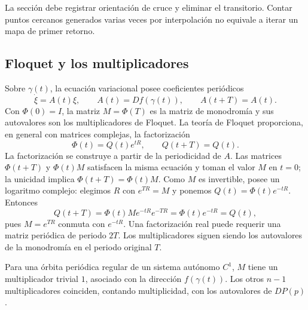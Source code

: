La sección debe registrar orientación de cruce y eliminar el transitorio.
Contar puntos cercanos generados varias veces por interpolación no equivale a
iterar un mapa de primer retorno.

\subsection{Floquet y los multiplicadores}

Sobre \(\gamma(t)\), la ecuación variacional posee coeficientes periódicos
\begin{equation}
 \dot\xi=A(t)\xi,\qquad A(t)=Df(\gamma(t)),\qquad A(t+T)=A(t).
 \label{geo:eq:periodic-variational}
\end{equation}
Con \(\Phi(0)=I\), la matriz \(M=\Phi(T)\) es la matriz de monodromía y sus autovalores son los
multiplicadores de Floquet. La teoría de Floquet proporciona, en general con
matrices complejas, la factorización
\begin{equation}
 \Phi(t)=Q(t)e^{tR},\qquad Q(t+T)=Q(t).
 \label{geo:eq:floquet-factorization}
\end{equation}
La factorización se construye a partir de la periodicidad de \(A\).
Las matrices \(\Phi(t+T)\) y \(\Phi(t)M\) satisfacen la misma ecuación y
toman el valor \(M\) en \(t=0\); la unicidad implica
\(\Phi(t+T)=\Phi(t)M\). Como \(M\) es invertible, posee un logaritmo
complejo: elegimos \(R\) con \(e^{TR}=M\) y ponemos
\(Q(t)=\Phi(t)e^{-tR}\). Entonces
\[
 Q(t+T)=\Phi(t)Me^{-tR}e^{-TR}=\Phi(t)e^{-tR}=Q(t),
\]
pues \(M=e^{TR}\) conmuta con \(e^{-tR}\). Una factorización real puede
requerir una matriz periódica de periodo
\(2T\). Los multiplicadores siguen siendo los autovalores de la monodromía
en el periodo original \(T\).

\begin{proposition}
Para una órbita periódica regular de un sistema autónomo \(C^1\), \(M\) tiene
un multiplicador trivial \(1\), asociado con la dirección \(f(\gamma(t))\).
Los otros \(n-1\) multiplicadores coinciden, contando multiplicidad, con los
autovalores de \(DP(p)\).
\end{proposition}

